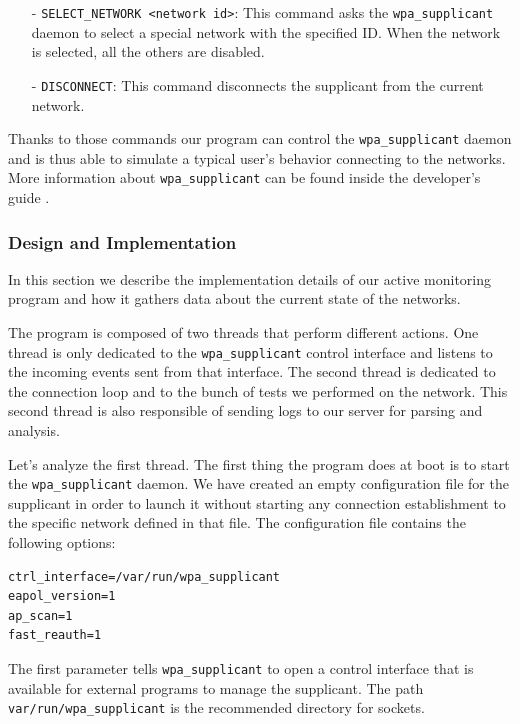 \begin{itemize}
	\item[-] \texttt{SELECT\_NETWORK <network id>}: This command asks the \texttt{wpa\_supplicant} daemon to select a special network with the specified ID. When the network is selected, all the others are disabled.

	\item[-] \texttt{DISCONNECT}: This command disconnects the supplicant from the current network.
\end{itemize}

Thanks to those commands our program can control the \texttt{wpa\_supplicant} daemon and is thus able to simulate a typical user's behavior connecting to the networks. More information about \texttt{wpa\_supplicant} can be found inside the developer's guide \cite{wpa-supplicant-devel}.


\subsubsection{Design and Implementation}
In this section we describe the implementation details of our active monitoring program and how it gathers data about the current state of the networks.

The program is composed of two threads that perform different actions. One thread is only dedicated to the \texttt{wpa\_supplicant} control interface and listens to the incoming events sent from that interface. The second thread is dedicated to the connection loop and to the bunch of tests we performed on the network. This second thread is also responsible of sending logs to our server for parsing and analysis.

Let's analyze the first thread. The first thing the program does at boot is to start the \texttt{wpa\_supplicant} daemon. We have created an empty configuration file for the supplicant in order to launch it without starting any connection establishment to the specific network defined in that file. The configuration file contains the following options:\\

\begin{lstlisting}[frame=single,breaklines=true,caption={\texttt{wpa\_supplicant.conf}}]
ctrl_interface=/var/run/wpa_supplicant
eapol_version=1
ap_scan=1
fast_reauth=1
\end{lstlisting}

\par The first parameter tells \texttt{wpa\_supplicant} to open a control interface that is available for external programs to manage the supplicant. The path \texttt{var/run/wpa\_supplicant} is the recommended directory for sockets. 

